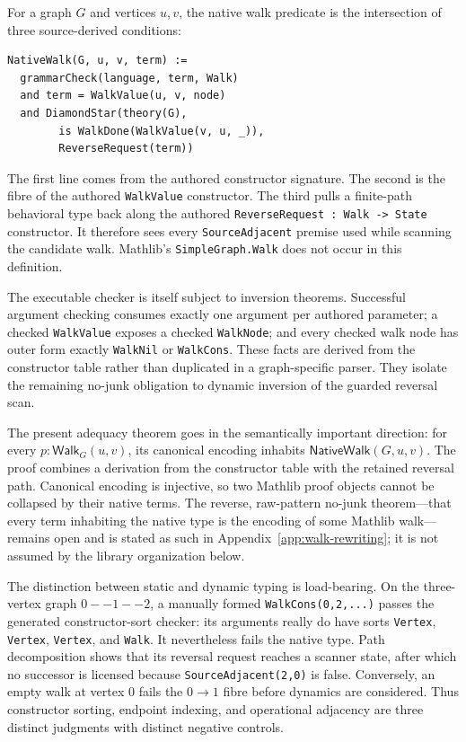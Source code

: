 \documentclass[11pt]{article}
\theoremstyle{remark}
\newcommand{\code}[1]{\texttt{#1}}
\begin{document}
For a graph \(G\) and vertices \(u,v\), the native walk predicate is the
intersection of three source-derived conditions:
\begin{lstlisting}[style=graphlang,language={}]
NativeWalk(G, u, v, term) :=
  grammarCheck(language, term, Walk)
  and term = WalkValue(u, v, node)
  and DiamondStar(theory(G),
        is WalkDone(WalkValue(v, u, _)),
        ReverseRequest(term))
\end{lstlisting}
The first line comes from the authored constructor signature.  The second is
the fibre of the authored \code{WalkValue} constructor.  The third pulls a
finite-path behavioral type back along the authored
\code{ReverseRequest : Walk -> State} constructor.  It therefore sees every
\code{SourceAdjacent} premise used while scanning the candidate walk.
Mathlib's \code{SimpleGraph.Walk} does not occur in this definition.

The executable checker is itself subject to inversion theorems.  Successful
argument checking consumes exactly one argument per authored parameter; a
checked \code{WalkValue} exposes a checked \code{WalkNode}; and every checked
walk node has outer form exactly \code{WalkNil} or \code{WalkCons}.  These
facts are derived from the constructor table rather than duplicated in a
graph-specific parser.  They isolate the remaining no-junk obligation to
dynamic inversion of the guarded reversal scan.

The present adequacy theorem goes in the semantically important direction:
for every \(p:\mathsf{Walk}_G(u,v)\), its canonical encoding inhabits
\(\mathsf{NativeWalk}(G,u,v)\).  The proof combines a derivation from the
constructor table with the retained reversal path.  Canonical encoding is
injective, so two Mathlib proof objects cannot be collapsed by their native
terms.  The reverse, raw-pattern no-junk theorem---that every term inhabiting
the native type is the encoding of some Mathlib walk---remains open and is
stated as such in Appendix~\ref{app:walk-rewriting}; it is not assumed by the
library organization below.

The distinction between static and dynamic typing is load-bearing.  On the
three-vertex graph \(0--1--2\), a manually formed
\code{WalkCons(0,2,...)} passes the generated constructor-sort checker: its
arguments really do have sorts \code{Vertex}, \code{Vertex}, \code{Vertex},
and \code{Walk}.  It nevertheless fails the native type.  Path decomposition
shows that its reversal request reaches a scanner state, after which no
successor is licensed because \code{SourceAdjacent(2,0)} is false.  Conversely,
an empty walk at vertex \(0\) fails the \(0\to1\) fibre before dynamics are
considered.  Thus constructor sorting, endpoint indexing, and operational
adjacency are three distinct judgments with distinct negative controls.
\end{document}
